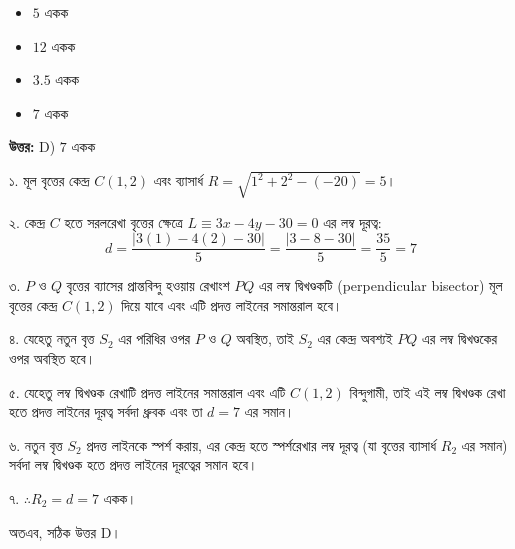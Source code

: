 \documentclass[12pt, a4paper]{article}
\begin{document}
\begin{itemize}[label={}, leftmargin=1cm, itemsep=0.5em]
    \item[\textbf{A)}] $5$ একক
    \item[\textbf{B)}] $12$ একক
    \item[\textbf{C)}] $3.5$ একক
    \item[\textbf{D)}] $7$ একক
\end{itemize}

\vspace{0.5em}
\begin{tcolorbox}[answerbox]
    \textbf{\color{success} উত্তর:} D) $7$ একক
\end{tcolorbox}
\vspace{1em}

\begin{tcolorbox}[solutionbox={সমাধান (Solution)}]
    \noindent
    ১. মূল বৃত্তের কেন্দ্র $C(1, 2)$ এবং ব্যাসার্ধ $R = \sqrt{1^2 + 2^2 - (-20)} = 5$।
    
    \vspace{0.5em}
    ২. কেন্দ্র $C$ হতে সরলরেখা বৃত্তের ক্ষেত্রে $L \equiv 3x - 4y - 30 = 0$ এর লম্ব দূরত্ব:
    \[ d = \frac{|3(1) - 4(2) - 30|}{5} = \frac{|3 - 8 - 30|}{5} = \frac{35}{5} = 7 \]
    
    \vspace{0.5em}
    ৩. $P$ ও $Q$ বৃত্তের ব্যাসের প্রান্তবিন্দু হওয়ায় রেখাংশ $PQ$ এর লম্ব দ্বিখণ্ডকটি (perpendicular bisector) মূল বৃত্তের কেন্দ্র $C(1, 2)$ দিয়ে যাবে এবং এটি প্রদত্ত লাইনের সমান্তরাল হবে।
    
    \vspace{0.5em}
    ৪. যেহেতু নতুন বৃত্ত $S_2$ এর পরিধির ওপর $P$ ও $Q$ অবস্থিত, তাই $S_2$ এর কেন্দ্র অবশ্যই $PQ$ এর লম্ব দ্বিখণ্ডকের ওপর অবস্থিত হবে।
    
    \vspace{0.5em}
    ৫. যেহেতু লম্ব দ্বিখণ্ডক রেখাটি প্রদত্ত লাইনের সমান্তরাল এবং এটি $C(1, 2)$ বিন্দুগামী, তাই এই লম্ব দ্বিখণ্ডক রেখা হতে প্রদত্ত লাইনের দূরত্ব সর্বদা ধ্রুবক এবং তা $d = 7$ এর সমান।
    
    \vspace{0.5em}
    ৬. নতুন বৃত্ত $S_2$ প্রদত্ত লাইনকে স্পর্শ করায়, এর কেন্দ্র হতে স্পর্শরেখার লম্ব দূরত্ব (যা বৃত্তের ব্যাসার্ধ $R_2$ এর সমান) সর্বদা লম্ব দ্বিখণ্ডক হতে প্রদত্ত লাইনের দূরত্বের সমান হবে।
    
    \vspace{0.5em}
    ৭. $\therefore R_2 = d = 7$ একক।
    
    \vspace{0.5em}
    অতএব, সঠিক উত্তর D।
\end{tcolorbox}
\end{document}
